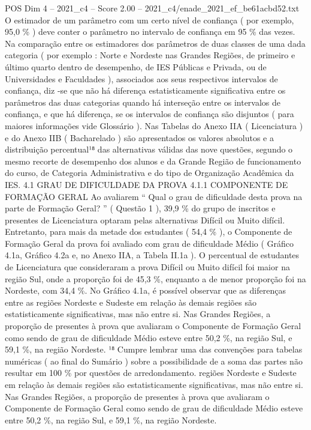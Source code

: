 \begin{textsample}{POS Dim 4 – 2021\_c4 – Score 2.00 – 2021\_c4/enade\_2021\_ef\_be61acbd52.txt}
O estimador de um parâmetro com um certo nível de confiança ( por exemplo, 95,0 \% ) deve conter o parâmetro no intervalo de confiança em 95 \% das vezes.
Na comparação entre os estimadores dos parâmetros de duas classes de uma dada categoria ( por exemplo : Norte e Nordeste nas Grandes Regiões, de primeiro e último quarto dentro de desempenho, de IES Públicas e Privada, ou de Universidades e Faculdades ), associados aos seus respectivos intervalos de confiança, diz -se que não há diferença estatisticamente significativa entre os parâmetros das duas categorias quando há interseção entre os intervalos de confiança, e que há diferença, se os intervalos de confiança são disjuntos ( para maiores informações vide Glossário ).
Nas Tabelas do Anexo IIA ( Licenciatura ) e do Anexo IIB ( Bacharelado ) são apresentados os valores absolutos e a distribuição percentual¹⁸ das alternativas válidas das nove questões, segundo o mesmo recorte de desempenho dos alunos e da Grande Região de funcionamento do curso, de Categoria Administrativa e do tipo de Organização Acadêmica da IES. 4.1 GRAU DE DIFICULDADE DA PROVA 4.1.1 COMPONENTE DE FORMAÇÃO GERAL Ao avaliarem “ Qual o grau de dificuldade desta prova na parte de Formação Geral? ” ( Questão 1 ), 39,9 \% do grupo de inscritos e presentes de Licenciatura optaram pelas alternativas Difícil ou Muito difícil.
Entretanto, para mais da metade dos estudantes ( 54,4 \% ), o Componente de Formação Geral da prova foi avaliado com grau de dificuldade Médio ( Gráfico 4.1a, Gráfico 4.2a e, no Anexo IIA, a Tabela II.1a ).
O percentual de estudantes de Licenciatura que consideraram a prova Difícil ou Muito difícil foi maior na região Sul, onde a proporção foi de 45,3 \%, enquanto a de menor proporção foi na Nordeste, com 34,4 \%.
No Gráfico 4.1a, é possível observar que as diferenças entre as regiões Nordeste e Sudeste em relação às demais regiões são estatisticamente significativas, mas não entre si.
Nas Grandes Regiões, a proporção de presentes à prova que avaliaram o Componente de Formação Geral como sendo de grau de dificuldade Médio esteve entre 50,2 \%, na região Sul, e 59,1 \%, na região Nordeste. ¹⁸ Cumpre lembrar uma das convenções para tabelas numéricas ( ao final do Sumário ) sobre a possibilidade de a soma das partes não resultar em 100 \% por questões de arredondamento. regiões Nordeste e Sudeste em relação às demais regiões são estatisticamente significativas, mas não entre si.
Nas Grandes Regiões, a proporção de presentes à prova que avaliaram o Componente de Formação Geral como sendo de grau de dificuldade Médio esteve entre 50,2 \%, na região Sul, e 59,1 \%, na região Nordeste.

\end{textsample}
